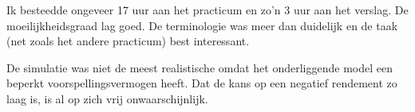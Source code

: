 
Ik besteedde ongeveer 17 uur aan het practicum en zo'n 3 uur aan het verslag. De moeilijkheidsgraad lag goed. De terminologie was meer dan duidelijk en de taak (net zoals het andere practicum) best interessant. 

\par\noindent De simulatie was niet de meest realistische omdat het onderliggende model een beperkt voorspellingsvermogen heeft. Dat de kans op een negatief rendement zo laag is, is al op zich vrij onwaarschijnlijk.